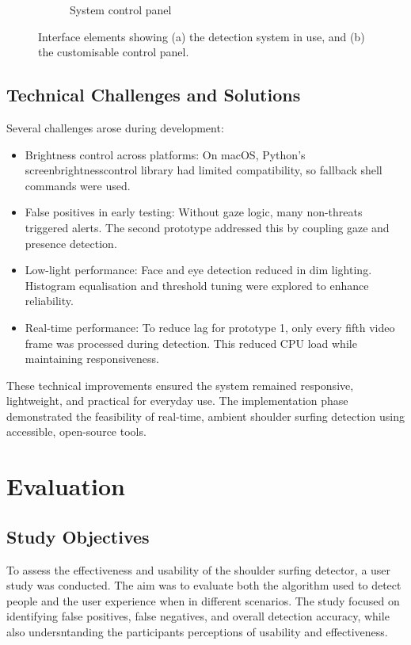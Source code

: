 \documentclass[12pt]{article}
\theoremstyle{plain}
\theoremstyle{definition}
\begin{document}
\begin{figure}[h!]
\begin{subfigure}[c]{0.45\textwidth}
    \caption{System control panel}
    \label{fig:gui_controls}
  \end{subfigure}
  \caption{Interface elements showing (a) the detection system in use, and (b) the customisable control panel.}
  \label{fig:gui_overview}
\end{figure}

\subsection{Technical Challenges and Solutions}

Several challenges arose during development:
\begin{itemize}
  \item Brightness control across platforms: On macOS, Python’s screen\textunderscore brightness\textunderscore control library had limited compatibility, so fallback shell commands were used.
  \item False positives in early testing: Without gaze logic, many non-threats triggered alerts. The second prototype addressed this by coupling gaze and presence detection.
  \item Low-light performance: Face and eye detection reduced in dim lighting. Histogram equalisation and threshold tuning were explored to enhance reliability.
  \item Real-time performance: To reduce lag for prototype 1, only every fifth video frame was processed during detection. This reduced CPU load while maintaining responsiveness.
\end{itemize}

These technical improvements ensured the system remained responsive, lightweight, and practical for everyday use. The implementation phase demonstrated the feasibility of real-time, ambient shoulder surfing detection using accessible, open-source tools.

\section{Evaluation}

\subsection{Study Objectives}

To assess the effectiveness and usability of the shoulder surfing detector, a user study was conducted. The aim was to evaluate both the algorithm used to detect people and the user experience when in different scenarios. The study focused on identifying false positives, false negatives, and overall detection accuracy, while also undersntanding the participants perceptions of usability and effectiveness.
\end{document}
